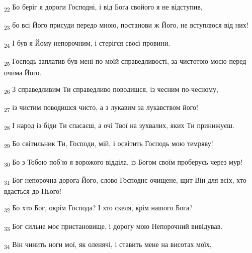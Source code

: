 \begin{tcolorbox}
\textsubscript{22} Бо беріг я дороги Господні, і від Бога свойого я не відступив,
\end{tcolorbox}
\begin{tcolorbox}
\textsubscript{23} бо всі Його присуди передо мною, постанови ж Його, не вступлюся від них!
\end{tcolorbox}
\begin{tcolorbox}
\textsubscript{24} І був я Йому непорочним, і стерігся своєї провини.
\end{tcolorbox}
\begin{tcolorbox}
\textsubscript{25} Господь заплатив був мені по моїй справедливості, за чистотою моєю перед очима Його.
\end{tcolorbox}
\begin{tcolorbox}
\textsubscript{26} З справедливим Ти справедливо поводишся, із чесним по-чесному,
\end{tcolorbox}
\begin{tcolorbox}
\textsubscript{27} із чистим поводишся чисто, а з лукавим за лукавством його!
\end{tcolorbox}
\begin{tcolorbox}
\textsubscript{28} І народ із біди Ти спасаєш, а очі Твої на зухвалих, яких Ти принижуєш.
\end{tcolorbox}
\begin{tcolorbox}
\textsubscript{29} Бо світильник Ти, Господи, мій, і освітить Господь мою темряву!
\end{tcolorbox}
\begin{tcolorbox}
\textsubscript{30} Бо з Тобою поб'ю я ворожого відділа, із Богом своїм проберусь через мур!
\end{tcolorbox}
\begin{tcolorbox}
\textsubscript{31} Бог непорочна дорога Його, слово Господнє очищене, щит Він для всіх, хто вдається до Нього!
\end{tcolorbox}
\begin{tcolorbox}
\textsubscript{32} Бо хто Бог, окрім Господа? І хто скеля, крім нашого Бога?
\end{tcolorbox}
\begin{tcolorbox}
\textsubscript{33} Бог сильне моє пристановище, і дорогу мою Непорочний вивідував.
\end{tcolorbox}
\begin{tcolorbox}
\textsubscript{34} Він чинить ноги мої, як оленячі, і ставить мене на висотах моїх,
\end{tcolorbox}
